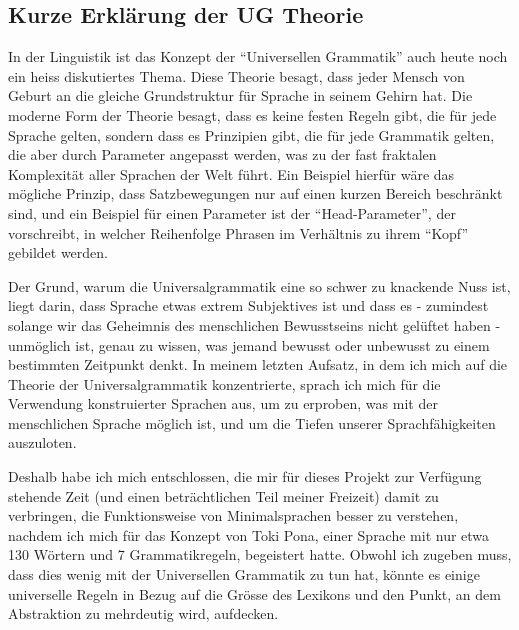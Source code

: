 \documentclass{article}
\begin{document}
\subsection{Kurze Erklärung der UG Theorie}
In der Linguistik ist das Konzept der ``Universellen Grammatik'' auch heute noch ein heiss diskutiertes Thema.
Diese Theorie besagt, dass jeder Mensch von Geburt an die gleiche Grundstruktur für Sprache in seinem Gehirn hat.
Die moderne Form der Theorie besagt, dass es keine festen Regeln gibt, die für jede Sprache gelten,
sondern dass es Prinzipien gibt, die für jede Grammatik gelten, die aber durch Parameter angepasst werden,
was zu der fast fraktalen Komplexität aller Sprachen der Welt führt. Ein Beispiel hierfür wäre das mögliche Prinzip,
dass Satzbewegungen nur auf einen kurzen Bereich beschränkt sind, und ein Beispiel für einen Parameter ist der ``Head-Parameter'',
der vorschreibt, in welcher Reihenfolge Phrasen im Verhältnis zu ihrem ``Kopf'' gebildet werden.\citep{ChUGAI}

Der Grund, warum die Universalgrammatik eine so schwer zu knackende Nuss ist, liegt darin, dass Sprache etwas extrem Subjektives
ist und dass es - zumindest solange wir das Geheimnis des menschlichen Bewusstseins nicht gelüftet haben - unmöglich ist,
genau zu wissen, was jemand bewusst oder unbewusst zu einem bestimmten Zeitpunkt denkt. In meinem letzten Aufsatz,
in dem ich mich auf die Theorie der Universalgrammatik konzentrierte, sprach ich mich für die Verwendung konstruierter Sprachen aus,
um zu erproben, was mit der menschlichen Sprache möglich ist, und um die Tiefen unserer Sprachfähigkeiten auszuloten.

Deshalb habe ich mich entschlossen, die mir für dieses Projekt zur Verfügung stehende Zeit (und einen beträchtlichen
Teil meiner Freizeit) damit zu verbringen, die Funktionsweise von Minimalsprachen besser zu verstehen,
nachdem ich mich für das Konzept von Toki Pona, einer Sprache mit nur etwa 130 Wörtern und 7 Grammatikregeln\citep{Lang14},
begeistert hatte. Obwohl ich zugeben muss, dass dies wenig mit der Universellen Grammatik zu tun hat,
könnte es einige universelle Regeln in Bezug auf die Grösse des Lexikons und den Punkt,
an dem Abstraktion zu mehrdeutig wird, aufdecken.
\end{document}
